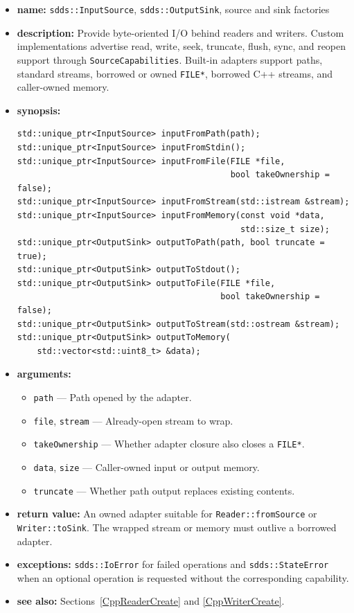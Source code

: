 \documentclass[11pt]{article}
\begin{document}
\begin{itemize}
\item {\bf name:}\newline
{\tt sdds::InputSource}, {\tt sdds::OutputSink}, source and sink factories
\item {\bf description:}\newline
Provide byte-oriented I/O behind readers and writers.  Custom implementations
advertise read, write, seek, truncate, flush, sync, and reopen support through
{\tt SourceCapabilities}.  Built-in adapters support paths, standard streams,
borrowed or owned {\tt FILE*}, borrowed C++ streams, and caller-owned memory.
\item {\bf synopsis:}
\begin{verbatim}
std::unique_ptr<InputSource> inputFromPath(path);
std::unique_ptr<InputSource> inputFromStdin();
std::unique_ptr<InputSource> inputFromFile(FILE *file,
                                           bool takeOwnership = false);
std::unique_ptr<InputSource> inputFromStream(std::istream &stream);
std::unique_ptr<InputSource> inputFromMemory(const void *data,
                                             std::size_t size);
std::unique_ptr<OutputSink> outputToPath(path, bool truncate = true);
std::unique_ptr<OutputSink> outputToStdout();
std::unique_ptr<OutputSink> outputToFile(FILE *file,
                                         bool takeOwnership = false);
std::unique_ptr<OutputSink> outputToStream(std::ostream &stream);
std::unique_ptr<OutputSink> outputToMemory(
    std::vector<std::uint8_t> &data);
\end{verbatim}
\item {\bf arguments:}
\begin{itemize}
\item {\tt path} --- Path opened by the adapter.
\item {\tt file}, {\tt stream} --- Already-open stream to wrap.
\item {\tt takeOwnership} --- Whether adapter closure also closes a
{\tt FILE*}.
\item {\tt data}, {\tt size} --- Caller-owned input or output memory.
\item {\tt truncate} --- Whether path output replaces existing contents.
\end{itemize}
\item {\bf return value:}\newline
An owned adapter suitable for {\tt Reader::fromSource} or
{\tt Writer::toSink}.  The wrapped stream or memory must outlive a borrowed
adapter.
\item {\bf exceptions:}\newline
{\tt sdds::IoError} for failed operations and {\tt sdds::StateError} when an
optional operation is requested without the corresponding capability.
\item {\bf see also:}\newline
Sections~\ref{CppReaderCreate} and \ref{CppWriterCreate}.
\end{itemize}
\end{document}
